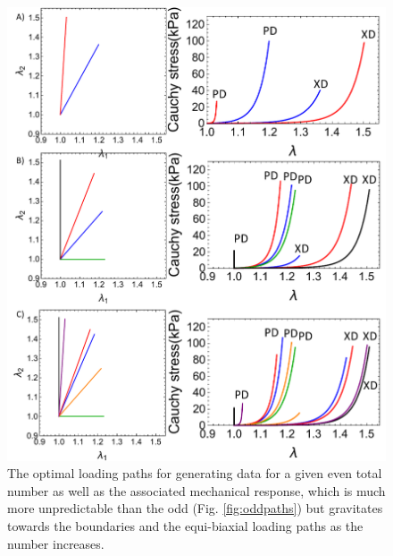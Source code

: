 \begin{figure}
\centering
\includegraphics[width=6.5in]{Figures/evenpaths}
\caption{The optimal loading paths for generating data for a given even total number as well as the associated mechanical response, which is much more unpredictable than the odd (Fig. \ref{fig:oddpaths}) but gravitates towards the boundaries and the equi-biaxial loading paths as the number increases.}
\label{fig:evenpaths}
\end{figure} 
